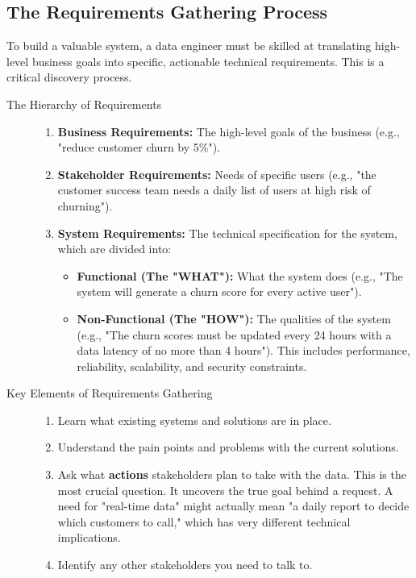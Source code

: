 \documentclass{article}
\begin{document}
\subsection{The Requirements Gathering Process}
To build a valuable system, a data engineer must be skilled at translating high-level business goals into specific, actionable technical requirements. This is a critical discovery process.
\begin{description}
    \item[The Hierarchy of Requirements]
        \begin{enumerate}
            \item \textbf{Business Requirements:} The high-level goals of the business (e.g., "reduce customer churn by 5\%").
            \item \textbf{Stakeholder Requirements:} Needs of specific users (e.g., "the customer success team needs a daily list of users at high risk of churning").
            \item \textbf{System Requirements:} The technical specification for the system, which are divided into:
            \begin{itemize}
                \item \textbf{Functional (The "WHAT"):} What the system does (e.g., "The system will generate a churn score for every active user").
                \item \textbf{Non-Functional (The "HOW"):} The qualities of the system (e.g., "The churn scores must be updated every 24 hours with a data latency of no more than 4 hours"). This includes performance, reliability, scalability, and security constraints.
            \end{itemize}
        \end{enumerate}
    \item[Key Elements of Requirements Gathering]
    \begin{enumerate}
        \item Learn what existing systems and solutions are in place.
        \item Understand the pain points and problems with the current solutions.
        \item Ask what \textbf{actions} stakeholders plan to take with the data. This is the most crucial question. It uncovers the true goal behind a request. A need for "real-time data" might actually mean "a daily report to decide which customers to call," which has very different technical implications.
        \item Identify any other stakeholders you need to talk to.
    \end{enumerate}
\end{description}
\end{document}
